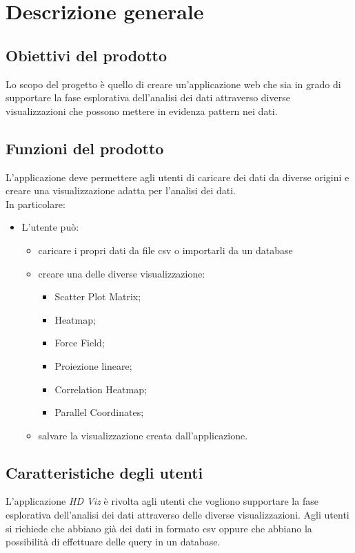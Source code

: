\section{Descrizione generale}

\subsection{Obiettivi del prodotto}
    Lo scopo del progetto è quello di creare un'applicazione web che sia in grado di supportare la fase esplorativa dell'analisi dei dati attraverso diverse visualizzazioni che possono mettere in evidenza pattern nei dati.

\subsection{Funzioni del prodotto}
    L'applicazione deve permettere agli utenti di caricare dei dati da diverse origini e creare una visualizzazione adatta per l'analisi dei dati.
    \\
    In particolare:
    \begin{itemize}
        \item L'utente può:
        \begin{itemize}
            \item caricare i propri dati da file csv o importarli da un database
            \item creare una delle diverse visualizzazione:
            \begin{itemize}
                \item Scatter Plot Matrix;
                \item Heatmap;
                \item Force Field;
                \item Proiezione lineare;
                \item Correlation Heatmap;
                \item Parallel Coordinates;
            \end{itemize}
            \item salvare la visualizzazione creata dall'applicazione.
        \end{itemize}
    \end{itemize}
    
\subsection{Caratteristiche degli utenti}
L'applicazione \emph{HD Viz} è rivolta agli utenti che vogliono supportare la fase esplorativa dell'analisi dei dati attraverso delle diverse visualizzazioni. Agli utenti si richiede che abbiano già dei dati in formato csv oppure che abbiano la possibilità di effettuare delle query in un database.


